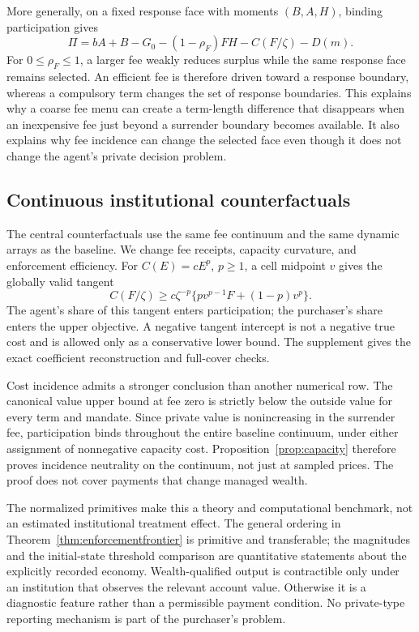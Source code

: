More generally, on a fixed response face with moments $(B,A,H)$, binding participation gives
\[
 \Pi=bA+B-G_0-(1-\rho_F)FH-C(F/\zeta)-D(m).
\]
For $0\leq\rho_F\leq1$, a larger fee weakly reduces surplus while the same response face remains selected. An efficient fee is therefore driven toward a response boundary, whereas a compulsory term changes the set of response boundaries. This explains why a coarse fee menu can create a term-length difference that disappears when an inexpensive fee just beyond a surrender boundary becomes available. It also explains why fee incidence can change the selected face even though it does not change the agent's private decision problem.

\subsection{Continuous institutional counterfactuals}
\label{sec:continuousinstitutions}
The central counterfactuals use the same fee continuum and the same dynamic arrays as the baseline. We change fee receipts, capacity curvature, and enforcement efficiency. For $C(E)=cE^p$, $p\geq1$, a cell midpoint $v$ gives the globally valid tangent
\[
 C(F/\zeta)\geq c\zeta^{-p}
     \{pv^{p-1}F+(1-p)v^p\}.
\]
The agent's share of this tangent enters participation; the purchaser's share enters the upper objective. A negative tangent intercept is not a negative true cost and is allowed only as a conservative lower bound. The supplement gives the exact coefficient reconstruction and full-cover checks.



Cost incidence admits a stronger conclusion than another numerical row. The canonical value upper bound at fee zero is strictly below the outside value for every term and mandate. Since private value is nonincreasing in the surrender fee, participation binds throughout the entire baseline continuum, under either assignment of nonnegative capacity cost. Proposition~\ref{prop:capacity} therefore proves incidence neutrality on the continuum, not just at sampled prices. The proof does not cover payments that change managed wealth.

The normalized primitives make this a theory and computational benchmark, not an estimated institutional treatment effect. The general ordering in Theorem~\ref{thm:enforcementfrontier} is primitive and transferable; the magnitudes and the initial-state threshold comparison are quantitative statements about the explicitly recorded economy. Wealth-qualified output is contractible only under an institution that observes the relevant account value. Otherwise it is a diagnostic feature rather than a permissible payment condition. No private-type reporting mechanism is part of the purchaser's problem.
